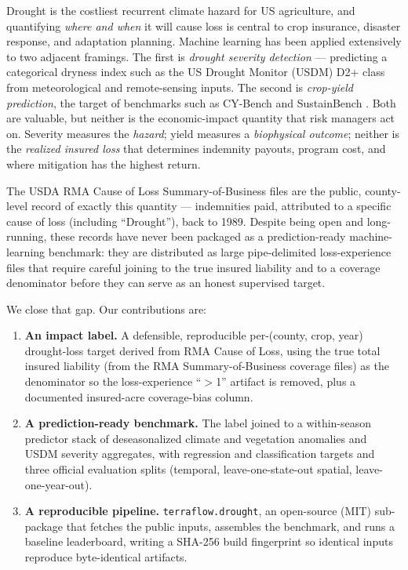 \documentclass[essd, manuscript]{copernicus}
\begin{document}
\introduction  %
\label{sec:intro}

Drought is the costliest recurrent climate hazard for US agriculture, and quantifying \emph{where and when} it will cause loss is central to crop insurance, disaster response, and adaptation planning. Machine learning has been applied extensively to two adjacent framings. The first is \emph{drought severity detection} --- predicting a categorical dryness index such as the US Drought Monitor (USDM) D2+ class from meteorological and remote-sensing inputs. The second is \emph{crop-yield prediction}, the target of benchmarks such as CY-Bench and SustainBench \citep{yeh2021sustainbench}. Both are valuable, but neither is the economic-impact quantity that risk managers act on. Severity measures the \emph{hazard}; yield measures a \emph{biophysical outcome}; neither is the \emph{realized insured loss} that determines indemnity payouts, program cost, and where mitigation has the highest return.

The USDA RMA Cause of Loss Summary-of-Business files \citep{usda_rma_col} are the public, county-level record of exactly this quantity --- indemnities paid, attributed to a specific cause of loss (including ``Drought''), back to 1989. Despite being open and long-running, these records have never been packaged as a prediction-ready machine-learning benchmark: they are distributed as large pipe-delimited loss-experience files that require careful joining to the true insured liability and to a coverage denominator before they can serve as an honest supervised target.

We close that gap. Our contributions are:
\begin{enumerate}
\item \textbf{An impact label.} A defensible, reproducible per-(county, crop, year) drought-loss target derived from RMA Cause of Loss, using the true total insured liability (from the RMA Summary-of-Business coverage files) as the denominator so the loss-experience ``$>$1'' artifact is removed, plus a documented insured-acre coverage-bias column.
\item \textbf{A prediction-ready benchmark.} The label joined to a within-season predictor stack of deseasonalized climate and vegetation anomalies and USDM severity aggregates, with regression and classification targets and three official evaluation splits (temporal, leave-one-state-out spatial, leave-one-year-out).
\item \textbf{A reproducible pipeline.} \texttt{terraflow.drought}, an open-source (MIT) sub-package that fetches the public inputs, assembles the benchmark, and runs a baseline leaderboard, writing a SHA-256 build fingerprint so identical inputs reproduce byte-identical artifacts.
\end{enumerate}
\end{document}
